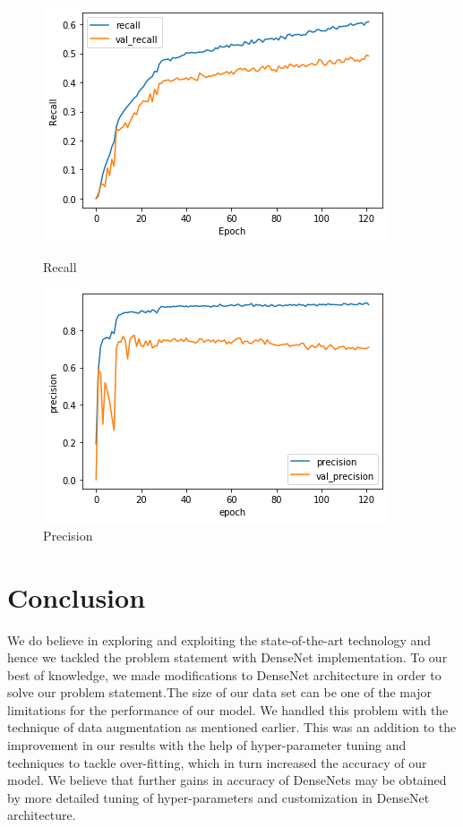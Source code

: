 \documentclass[a4paper,19pt]{article}
\begin{document}
\begin{figure}[h!]
  \centering
  \begin{minipage}[b]{0.4\textwidth}
    \includegraphics[scale=0.6]{images/re.png}
    \caption{Recall}
    \label{fig:Recall}
  \end{minipage}
  \hfill
  \begin{minipage}[b]{0.4\textwidth}
    \includegraphics[scale=0.6]{images/pre.png}
    \caption{Precision}
    \label{fig:Precision}
  \end{minipage}
\end{figure}

\section{Conclusion}
We do believe in exploring and exploiting the state-of-the-art technology and hence we tackled the problem statement with DenseNet implementation. To our best of knowledge, we made modifications to DenseNet architecture in order to solve our problem statement.The size of our data set can be one of the major limitations for the performance of our model. We handled this problem with the technique of data augmentation as mentioned earlier. This was an addition to the improvement in our results with the help of hyper-parameter tuning and techniques to tackle over-fitting, which in turn increased the accuracy of our model. 
We believe that further gains in accuracy of DenseNets may be obtained by more detailed tuning of hyper-parameters and customization in DenseNet architecture.
\end{document}
